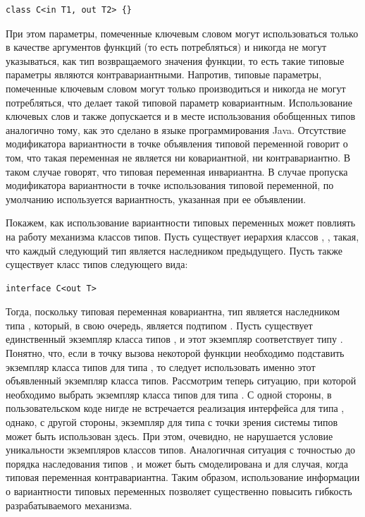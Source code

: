 \begin{lstlisting}[style=wo_caption]
class C<in T1, out T2> {}
\end{lstlisting}
При этом параметры, помеченные ключевым словом  могут использоваться только в качестве аргументов функций (то есть потребляться) и никогда не могут указываться, как тип возвращаемого значения функции, то есть такие типовые параметры являются контравариантными. Напротив, типовые параметры, помеченные ключевым словом  могут только производиться и никогда не могут потребляться, что делает такой типовой параметр ковариантным. Использование ключевых слов  и  также допускается и в месте использования обобщенных типов аналогично тому, как это сделано в языке программирования Java. Отсутствие модификатора вариантности в точке объявления типовой переменной говорит о том, что такая переменная не является ни ковариантной, ни контравариантно. В таком случае говорят, что типовая переменная инвариантна. В случае пропуска модификатора вариантности в точке использования типовой переменной, по умолчанию используется вариантность, указанная при ее объявлении. 

Покажем, как использование вариантности типовых переменных может повлиять на работу механизма классов типов. Пусть существует иерархия классов , ,  такая, что каждый следующий тип является наследником предыдущего. Пусть также существует класс типов  следующего вида:
\begin{lstlisting}[style=wo_caption]
interface C<out T>
\end{lstlisting}
Тогда, поскольку типовая переменная  ковариантна, тип  является наследником типа , который, в свою очередь, является подтипом . Пусть существует единственный экземпляр класса типов , и этот экземпляр соответствует типу . Понятно, что, если в точку вызова некоторой функции необходимо подставить экземпляр класса типов  для типа , то следует использовать именно этот объявленный экземпляр класса типов. Рассмотрим теперь ситуацию, при которой необходимо выбрать экземпляр класса типов  для типа . С одной стороны, в пользовательском коде нигде не встречается реализация интерфейса  для типа , однако, с другой стороны, экземпляр для типа  с точки зрения системы типов может быть использован здесь. При этом, очевидно, не нарушается условие уникальности экземпляров классов типов. Аналогичная ситуация с точностью до порядка наследования типов ,  и  может быть смоделирована и для случая, когда типовая переменная  контравариантна. Таким образом, использование информации о вариантности типовых переменных позволяет существенно повысить гибкость разрабатываемого механизма. 

